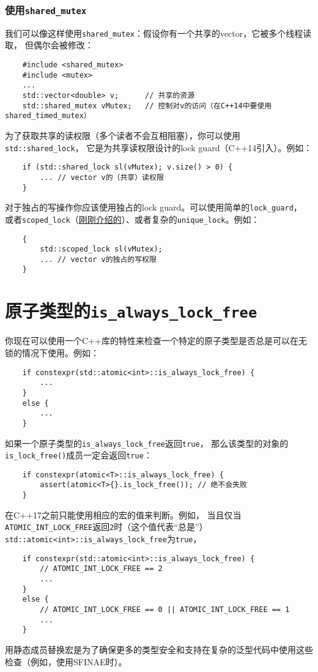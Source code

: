 \subsubsection{使用\texttt{shared\_mutex}}
我们可以像这样使用\texttt{shared\_mutex}：假设你有一个共享的vector，它被多个线程读取，
但偶尔会被修改：
\begin{lstlisting}
    #include <shared_mutex>
    #include <mutex>
    ...
    std::vector<double> v;      // 共享的资源
    std::shared_mutex vMutex;   // 控制对v的访问（在C++14中要使用shared_timed_mutex）
\end{lstlisting}
为了获取共享的读权限（多个读者不会互相阻塞），你可以使用\texttt{std::shared\_lock}，
它是为共享读权限设计的lock guard（C++14引入）。例如：
\begin{lstlisting}
    if (std::shared_lock sl(vMutex); v.size() > 0) {
        ... // vector v的（共享）读权限
    }
\end{lstlisting}
对于独占的写操作你应该使用独占的lock guard。可以使用简单的\texttt{lock\_guard}，
或者\texttt{scoped\_lock}（\hyperref[ch27.1.1]{刚刚介绍的}）、或者复杂的\texttt{unique\_lock}。例如：
\begin{lstlisting}
    {
        std::scoped_lock sl(vMutex);
        ... // vector v的独占的写权限
    }
\end{lstlisting}


\section{原子类型的\texttt{is\_always\_lock\_free}}
你现在可以使用一个C++库的特性来检查一个特定的原子类型是否总是可以在无锁的情况下使用。例如：
\begin{lstlisting}
    if constexpr(std::atomic<int>::is_always_lock_free) {
        ...
    }
    else {
        ...
    }
\end{lstlisting}
如果一个原子类型的\texttt{is\_always\_lock\_free}返回\texttt{true}，
那么该类型的对象的\texttt{is\_lock\_free()}成员一定会返回\texttt{true}：
\begin{lstlisting}
    if constexpr(atomic<T>::is_always_lock_free) {
        assert(atomic<T>{}.is_lock_free()); // 绝不会失败
    }
\end{lstlisting}
在C++17之前只能使用相应的宏的值来判断。例如，
当且仅当\texttt{ATOMIC\_INT\_LOCK\_FREE}返回\texttt{2}时（这个值代表“总是”）
\texttt{std::atomic<int>::is\_always\_lock\_free}为\texttt{true}，
\begin{lstlisting}
    if constexpr(std::atomic<int>::is_always_lock_free) {
        // ATOMIC_INT_LOCK_FREE == 2
        ...
    }
    else {
        // ATOMIC_INT_LOCK_FREE == 0 || ATOMIC_INT_LOCK_FREE == 1
        ...
    }
\end{lstlisting}
用静态成员替换宏是为了确保更多的类型安全和支持在复杂的泛型代码中使用这些检查（例如，使用SFINAE时）。

